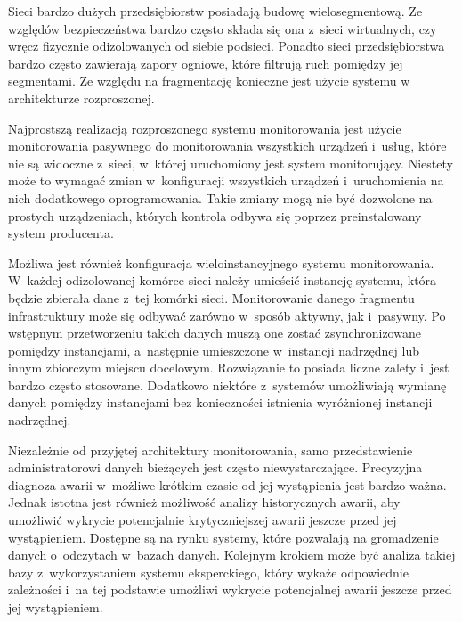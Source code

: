 Sieci bardzo dużych przedsiębiorstw posiadają budowę
wielosegmentową. Ze względów bezpieczeństwa bardzo często składa się
ona z~sieci wirtualnych, czy wręcz fizycznie odizolowanych od siebie
podsieci. Ponadto sieci przedsiębiorstwa bardzo często zawierają
zapory ogniowe, które filtrują ruch pomiędzy jej segmentami. Ze
względu na fragmentację konieczne jest użycie systemu w architekturze
rozproszonej.

Najprostszą realizacją rozproszonego systemu monitorowania jest użycie
monitorowania pasywnego do monitorowania wszystkich urządzeń i~usług,
które nie są widoczne z~sieci, w~której uruchomiony jest system
monitorujący. Niestety może to wymagać zmian w~konfiguracji wszystkich
urządzeń i~uruchomienia na nich dodatkowego oprogramowania. Takie
zmiany mogą nie być dozwolone na prostych urządzeniach, których
kontrola odbywa się poprzez preinstalowany system producenta.

Możliwa jest również konfiguracja wieloinstancyjnego systemu
monitorowania. W~każdej odizolowanej komórce sieci należy umieścić
instancję systemu, która będzie zbierała dane z~tej komórki
sieci. Monitorowanie danego fragmentu infrastruktury może się odbywać
zarówno w~sposób aktywny, jak i~pasywny. Po wstępnym przetworzeniu
takich danych muszą one zostać zsynchronizowane pomiędzy instancjami,
a~następnie umieszczone w~instancji nadrzędnej lub innym zbiorczym
miejscu docelowym. Rozwiązanie to posiada liczne zalety i~jest bardzo
często stosowane. Dodatkowo niektóre z~systemów umożliwiają wymianę
danych pomiędzy instancjami bez konieczności istnienia wyróżnionej
instancji nadrzędnej.

Niezależnie od przyjętej architektury monitorowania, samo
przedstawienie administratorowi danych bieżących jest często
niewystarczające. Precyzyjna diagnoza awarii w~możliwe krótkim czasie od
jej wystąpienia jest bardzo ważna. Jednak istotna jest również
możliwość analizy historycznych awarii, aby umożliwić wykrycie
potencjalnie krytyczniejszej awarii jeszcze przed jej
wystąpieniem. Dostępne są na rynku systemy, które pozwalają na
gromadzenie danych o~odczytach w~bazach danych. Kolejnym krokiem może
być analiza takiej bazy z~wykorzystaniem systemu eksperckiego,
który wykaże odpowiednie zależności i~na tej podstawie umożliwi
wykrycie potencjalnej awarii jeszcze przed jej wystąpieniem.


